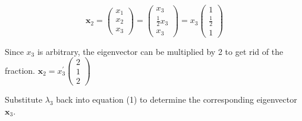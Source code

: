 \documentclass[12pt]{article}
\begin{document}
\begin{equation*}
	\mathbf{x}_{2}=\left(\begin{array}{l}
			x_{1} \\
			x_{2} \\
			x_{3}
		\end{array}\right)=\left(\begin{array}{c}
			x_{3}             \\
			\frac{1}{2} x_{3} \\
			x_{3}
		\end{array}\right)=x_{3}\left(\begin{array}{c}
			1           \\
			\frac{1}{2} \\
			1
		\end{array}\right)
\end{equation*}

Since \(x_{3}\) is arbitrary, the eigenvector can be multiplied by 2 to get rid of
the fraction. 
\(\mathbf{x}_{2}=x_{3}^{\prime}\left(\begin{array}{l}2 \\ 1 \\ 2\end{array}\right)\)

Substitute \(\lambda_{3}\) back into equation (1) to determine the corresponding
eigenvector \(\mathbf{x}_{3}\).
\end{document}
